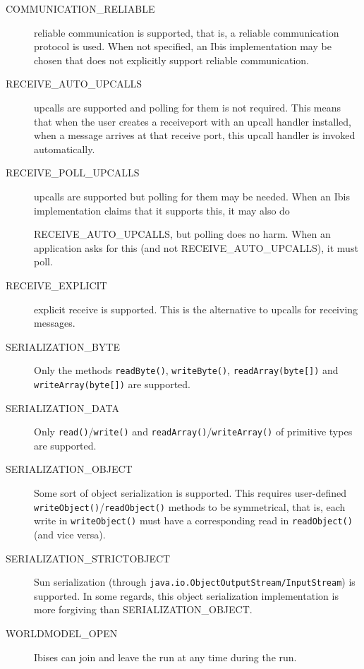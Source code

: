 \documentclass[10pt]{article}
\begin{document}
\begin{description}
\item[COMMUNICATION\_RELIABLE]
reliable communication is supported, that is,
a reliable communication protocol is used.
When not specified, an Ibis implementation may be chosen that does not
explicitly
support reliable communication.

\item[RECEIVE\_AUTO\_UPCALLS]
upcalls are supported and polling for them is not required.
This means that when the user creates a receiveport with an upcall
handler installed, when a message arrives at that receive port, 
this upcall handler is invoked automatically.

\item[RECEIVE\_POLL\_UPCALLS]
upcalls are supported but polling for them may be needed. When an
Ibis implementation claims that it supports this, it may also do

RECEIVE\_AUTO\_UPCALLS, but polling does no harm. When an application
asks for
this (and not RECEIVE\_AUTO\_UPCALLS), it must poll.

\item[RECEIVE\_EXPLICIT]
explicit receive is supported.
This is the alternative to upcalls for receiving messages.

\item[SERIALIZATION\_BYTE]
Only the methods \texttt{readByte()}, \texttt{writeByte()},
\texttt{readArray(byte[])} and \texttt{writeArray(byte[])} are
supported.

\item[SERIALIZATION\_DATA]
Only \texttt{read()}/\texttt{write()} and
\texttt{readArray()}/\texttt{writeArray()} of primitive types are
supported.

\item[SERIALIZATION\_OBJECT]
Some sort of object serialization is supported.
This requires user-defined
\texttt{writeObject()}/\texttt{readObject()} methods to be symmetrical,
that is,
each write in \texttt{writeObject()} must have a corresponding read
in \texttt{readObject()} (and vice versa).

\item[SERIALIZATION\_STRICTOBJECT]
Sun serialization (through
\texttt{java.io.ObjectOutputStream/InputStream}) is
supported. In some regards, this object serialization implementation is
more
forgiving than SERIALIZATION\_OBJECT.

\item[WORLDMODEL\_OPEN]
Ibises can join and leave the run at any time during the run.

\end{description}
\end{document}
